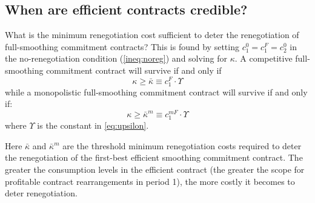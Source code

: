 \documentclass[11pt,english]{article}
\theoremstyle{plain}
\theoremstyle{definition}
\begin{document}
\subsection{When are efficient  contracts credible?}

What is the minimum renegotiation cost sufficient to deter the renegotiation
of full-smoothing commitment contracts? This is found by setting $c_{1}^{0}=c_{1}^{F}=c_{2}^{0}$
in the no-renegotiation condition (\ref{ineq:noreg}) and solving
for $\kappa$. A competitive full-smoothing commitment contract will
survive if and only if 
\begin{equation}
\kappa\geq\bar{\kappa}\equiv c_{1}^{F}\cdot\Upsilon\label{eq:kbar}
\end{equation}
while a monopolistic full-smoothing commitment contract will survive
if and only if: 
\begin{equation}
\kappa\geq\bar{\kappa}^{m}\equiv c_{1}^{mF}\cdot\Upsilon\label{eq:kbarM}
\end{equation}
where $\Upsilon$ is the constant in \ref{eq:upsilon}.

Here $\bar{\kappa}$ and $\bar{\kappa}^{m}$ are the threshold minimum
renegotiation costs required to deter the renegotiation of the first-best
efficient smoothing commitment contract. The greater the consumption
levels in the efficient contract (the greater the scope for profitable
contract rearrangements in period 1), the more costly it becomes to
deter renegotiation.
\end{document}
